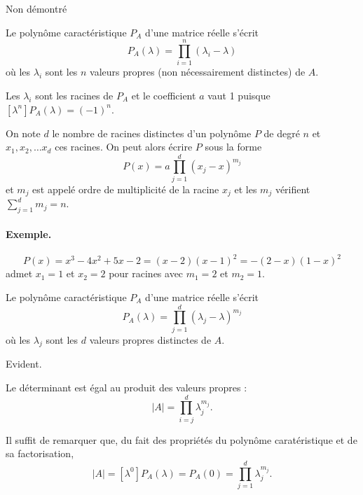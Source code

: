 \proof
Non démontré
\eproof

\begin{corollary*}
  Le polynôme caractéristique $P_A$ d'une matrice réelle s'écrit
  $$
  P_A(\lambda) = \prod_{i=1}^n (\lambda_i - \lambda)
  $$
  où les $\lambda_i$ sont les $n$ valeurs propres (non nécessairement distinctes) de $A$.
\end{corollary*}

\proof
Les $\lambda_i$ sont les racines de $P_A$ et le coefficient $a$ vaut 1 puisque $[\lambda^n]P_A(\lambda) = (-1)^n$.
\eproof

\begin{definition}
  On note $d$ le nombre de racines distinctes d'un polynôme $P$ de degré $n$ et $x_1, x_2, \dots x_d$ ces racines. On peut alors écrire $P$ sous la forme
  $$
  P(x) = a \prod_{j=1}^d (x_j - x)^{m_j}
  $$
  et $m_j$ est appelé ordre de multiplicité de la racine $x_j$ et les $m_j$ vérifient $ \sum_{j=1}^d m_j = n$.
\end{definition}

\paragraph*{Exemple.} 
$$
P(x) = x^3 - 4x^2 + 5x - 2 = (x-2)(x-1)^2 = - (2-x)(1-x)^2
$$ 
admet $x_1 = 1$ et $x_2 = 2$ pour racines avec $m_1 = 2$ et $m_2 = 1$.


\begin{corollary*}
  Le polynôme caractéristique $P_A$ d'une matrice réelle s'écrit
  $$
  P_A(\lambda) = \prod_{j=1}^d (\lambda_j - \lambda)^{m_j}
  $$
  où les $\lambda_j$ sont les $d$ valeurs propres distinctes de $A$.
\end{corollary*}

\proof
Evident.\eproof

\begin{corollary*}
  Le déterminant est égal au produit des valeurs propres : 
  $$
  |A| = \prod_{i=j}^d \lambda_j^{m_j}.
  $$
\end{corollary*}

\proof
  Il suffit de remarquer que, du fait des propriétés du polynôme caratéristique et de sa factorisation, 
  $$
  |A| = [\lambda^0]P_A(\lambda) = P_A(0) = \prod_{j=1}^d \lambda_j^{m_j}.
  $$
\eproof

